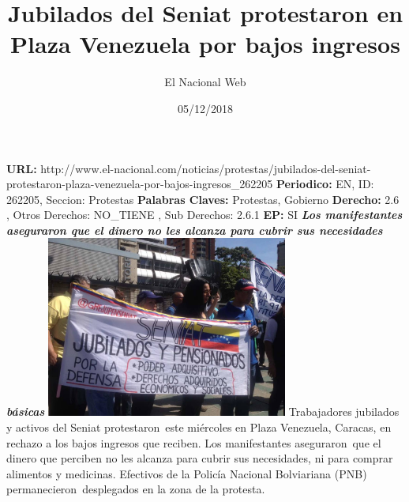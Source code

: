 \documentclass{article}%
\title{\textbf{Jubilados del Seniat protestaron en Plaza Venezuela por bajos ingresos}}%
\author{El Nacional Web}%
\date{05/12/2018}%
\begin{document}
%
\normalsize%
\maketitle%
\textbf{URL: }%
http://www.el{-}nacional.com/noticias/protestas/jubilados{-}del{-}seniat{-}protestaron{-}plaza{-}venezuela{-}por{-}bajos{-}ingresos\_262205\newline%
%
\textbf{Periodico: }%
EN, %
ID: %
262205, %
Seccion: %
Protestas\newline%
%
\textbf{Palabras Claves: }%
Protestas, Gobierno\newline%
%
\textbf{Derecho: }%
2.6%
, Otros Derechos: %
NO\_TIENE%
, Sub Derechos: %
2.6.1%
\newline%
%
\textbf{EP: }%
SI\newline%
\newline%
%
\textbf{\textit{Los manifestantes aseguraron que el dinero no les alcanza para cubrir sus necesidades básicas}}%
\newline%
\newline%
%
\includegraphics[width=300px]{225.jpg}%
\newline%
%
Trabajadores jubilados y activos del Seniat protestaron~este miércoles en Plaza Venezuela, Caracas, en rechazo a los bajos ingresos que reciben.%
\newline%
%
Los manifestantes aseguraron~que el dinero que perciben no les alcanza para cubrir sus necesidades, ni para comprar alimentos y medicinas.%
\newline%
%
Efectivos de la Policía Nacional Bolviariana (PNB) permanecieron~desplegados en la zona de la protesta.%
\newline%
%
\end{document}

